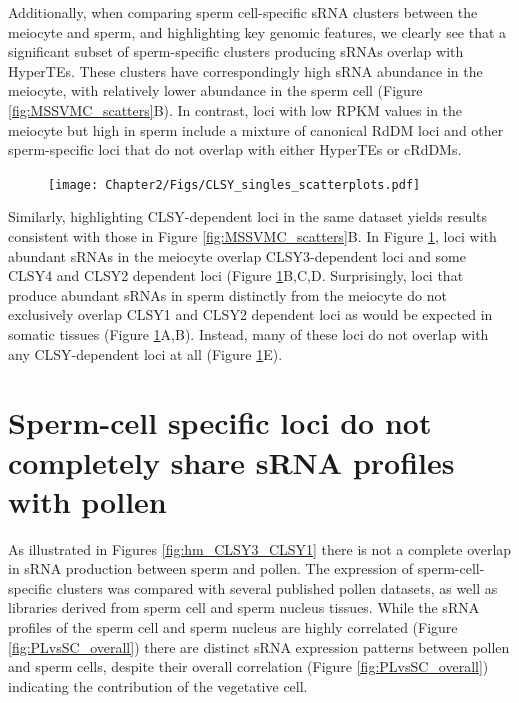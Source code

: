 Additionally, when comparing sperm cell-specific sRNA clusters between the meiocyte and sperm, and highlighting key genomic features, we clearly see that a significant subset of sperm-specific clusters producing sRNAs overlap with HyperTEs. These clusters have correspondingly high sRNA abundance in the meiocyte, with relatively lower abundance in the sperm cell (Figure \ref{fig:MSSVMC_scatters}B). In contrast, loci with low RPKM values in the meiocyte but high in sperm include a mixture of canonical RdDM loci and other sperm-specific loci that do not overlap with either HyperTEs or cRdDMs.

\begin{figure}[htbp!] 
\centering    
    \texttt{[image: Chapter2/Figs/CLSY\_singles\_scatterplots.pdf]}
\caption{\textbf{}}
\label{fig:clsysingle_scatters}
\captionsetup{font=small}
    \caption*{}
\end{figure}

Similarly, highlighting CLSY-dependent loci in the same dataset  yields results consistent with those in Figure \ref{fig:MSSVMC_scatters}B. In Figure \ref{fig:clsysingle_scatters}, loci with abundant sRNAs in the meiocyte overlap CLSY3-dependent loci and some CLSY4 and CLSY2 dependent loci (Figure \ref{fig:clsysingle_scatters}B,C,D. Surprisingly, loci that produce abundant sRNAs in sperm distinctly from the meiocyte do not exclusively overlap CLSY1 and CLSY2 dependent loci as would be expected in somatic tissues (Figure \ref{fig:clsysingle_scatters}A,B). Instead, many of these loci do not overlap with any CLSY-dependent loci at all (Figure \ref{fig:clsysingle_scatters}E). 

\section{Sperm-cell specific loci do not completely share sRNA profiles with pollen}

As illustrated in Figures \ref{fig:hm_CLSY3_CLSY1} there is not a complete overlap in sRNA production between sperm and pollen. The expression of sperm-cell-specific clusters was compared with several published pollen datasets, as well as libraries derived from sperm cell and sperm nucleus tissues. While the sRNA profiles of the sperm cell and sperm nucleus are highly correlated (Figure \ref{fig:PLvsSC_overall}) there are distinct sRNA expression patterns between pollen and sperm cells, despite their overall correlation (Figure \ref{fig:PLvsSC_overall}) indicating the contribution of the vegetative cell. 

